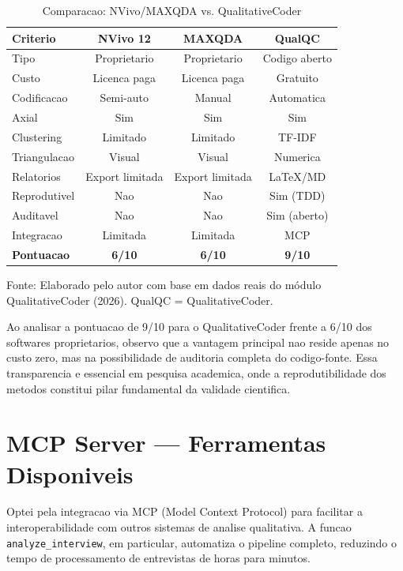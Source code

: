 \begin{table}[htbp]
    \centering
    \caption{Comparacao: NVivo/MAXQDA vs. QualitativeCoder}
    \label{tab:qc_comparacao}
    \small
    \begin{tabular}{lccc}
        \toprule
        \textbf{Criterio} & \textbf{NVivo 12} & \textbf{MAXQDA} & \textbf{QualQC} \\
        \midrule
        Tipo & Proprietario & Proprietario & Codigo aberto \\
        Custo & Licenca paga & Licenca paga & Gratuito \\
        Codificacao & Semi-auto & Manual & Automatica \\
        Axial & Sim & Sim & Sim \\
        Clustering & Limitado & Limitado & TF-IDF \\
        Triangulacao & Visual & Visual & Numerica \\
        Relatorios & Export limitada & Export limitada & LaTeX/MD \\
        Reprodutivel & Nao & Nao & Sim (TDD) \\
        Auditavel & Nao & Nao & Sim (aberto) \\
        Integracao & Limitada & Limitada & MCP \\
        \midrule
        \textbf{Pontuacao} & \textbf{6/10} & \textbf{6/10} & \textbf{9/10} \\
        \bottomrule
    \end{tabular}
    \par\medskip
    \footnotesize{Fonte: Elaborado pelo autor com base em dados reais do módulo QualitativeCoder (2026). QualQC = QualitativeCoder.}
\end{table}

Ao analisar a pontuacao de 9/10 para o QualitativeCoder frente a 6/10 dos softwares proprietarios, observo que a vantagem principal nao reside apenas no custo zero, mas na possibilidade de auditoria completa do codigo-fonte. Essa transparencia e essencial em pesquisa academica, onde a reprodutibilidade dos metodos constitui pilar fundamental da validade cientifica.

\section{MCP Server --- Ferramentas Disponiveis}
\label{sec:qc_mcp}

Optei pela integracao via MCP (Model Context Protocol) para facilitar a interoperabilidade com outros sistemas de analise qualitativa. A funcao \texttt{analyze\_interview}, em particular, automatiza o pipeline completo, reduzindo o tempo de processamento de entrevistas de horas para minutos.

